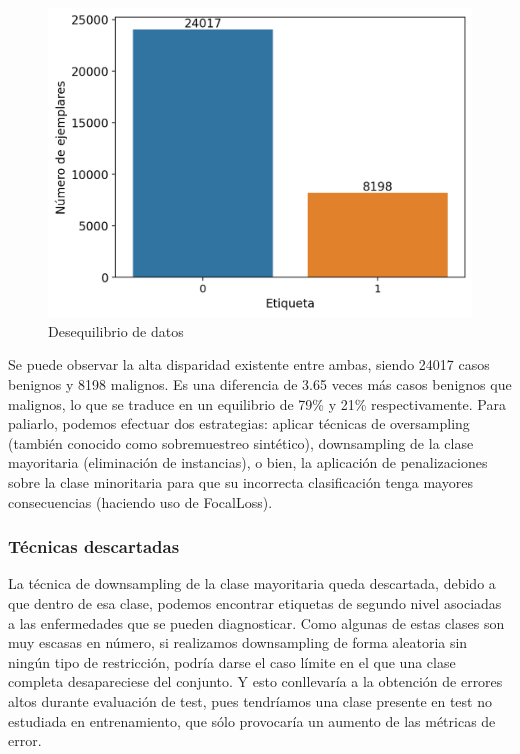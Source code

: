 \begin{figure}[H]
	\centering
	\label {desequilibriototal}
	\includegraphics[scale = 0.7]{imagenes/countBinary.png}
	\caption{Desequilibrio de datos}
\end{figure}

Se puede observar la alta disparidad existente entre ambas, siendo 24017 casos benignos y 8198 malignos. Es una diferencia de 3.65 veces más casos benignos que malignos, lo que se traduce en un equilibrio de  79\% y 21\% respectivamente. Para paliarlo, podemos efectuar dos estrategias: aplicar técnicas de oversampling (también conocido como sobremuestreo sintético), downsampling de la clase mayoritaria (eliminación de instancias), o bien, la aplicación de penalizaciones sobre la clase minoritaria para que su incorrecta clasificación tenga mayores consecuencias (haciendo uso de FocalLoss).\\

\subsubsection{Técnicas descartadas}

La técnica de downsampling de la clase mayoritaria queda descartada, debido a que dentro de esa clase, podemos encontrar etiquetas de segundo nivel asociadas a las enfermedades que se pueden diagnosticar. Como algunas de estas clases son muy escasas en número, si realizamos downsampling de forma aleatoria sin ningún tipo de restricción, podría darse el caso límite en el que una clase completa desapareciese del conjunto. Y esto conllevaría a la obtención de errores altos durante evaluación de test, pues tendríamos una clase presente en test no estudiada en entrenamiento, que sólo provocaría un aumento de las métricas de error. \\

